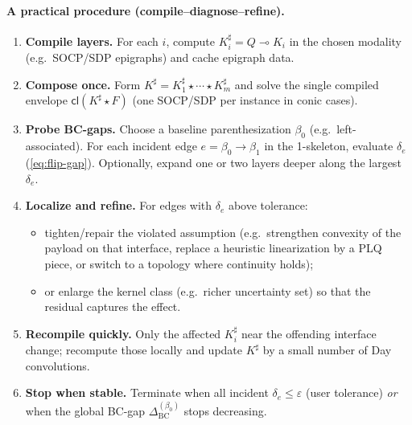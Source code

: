 \documentclass[11pt]{article}
\numberwithin{equation}{section}
\theoremstyle{upright}
\begin{document}
\paragraph{A practical procedure (compile--diagnose--refine).}
\begin{enumerate}[leftmargin=*, itemsep=.35ex]
\item \textbf{Compile layers.} For each $i$, compute $K_i^\sharp=Q\multimap K_i$ in the chosen
modality (e.g.\ SOCP/SDP epigraphs) and cache epigraph data.
\item \textbf{Compose once.} Form $K^\sharp=K_1^\sharp\star\cdots\star K_m^\sharp$ and solve the
single compiled envelope $\mathsf{cl}(K^\sharp\star F)$ (one SOCP/SDP per instance in conic cases).
\item \textbf{Probe BC-gaps.} Choose a baseline parenthesization $\beta_0$ (e.g.\ left-associated).
For each incident edge $e=\beta_0\!\to\!\beta_1$ in the 1-skeleton, evaluate $\delta_e$
(\eqref{eq:flip-gap}). Optionally, expand one or two layers deeper along the largest $\delta_e$.
\item \textbf{Localize and refine.} For edges with $\delta_e$ above tolerance:
  \begin{itemize}[itemsep=.1ex]
  \item tighten/repair the violated assumption (e.g.\ strengthen convexity of the payload on that interface,
        replace a heuristic linearization by a PLQ piece, or switch to a topology where continuity holds);
  \item or enlarge the kernel class (e.g.\ richer uncertainty set) so that the residual captures the effect.
  \end{itemize}
\item \textbf{Recompile quickly.} Only the affected $K_i^\sharp$ near the offending interface
change; recompute those locally and update $K^\sharp$ by a small number of Day convolutions.
\item \textbf{Stop when stable.} Terminate when all incident $\delta_e\le\varepsilon$ (user tolerance) \emph{or}
when the global BC-gap $\Delta_{\mathrm{BC}}^{(\beta_0)}$ stops decreasing.
\end{enumerate}
\end{document}
